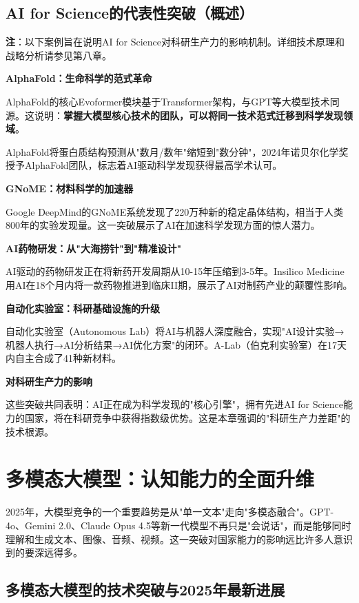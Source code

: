 \subsection{AI for Science的代表性突破（概述）}

\textbf{注}：以下案例旨在说明AI for Science对科研生产力的影响机制。详细技术原理和战略分析请参见第八章。

\textbf{AlphaFold：生命科学的范式革命}

AlphaFold的核心Evoformer模块基于Transformer架构，与GPT等大模型技术同源。这说明：\textbf{掌握大模型核心技术的团队，可以将同一技术范式迁移到科学发现领域}。

AlphaFold将蛋白质结构预测从"数月/数年"缩短到"数分钟"，2024年诺贝尔化学奖授予AlphaFold团队，标志着AI驱动科学发现获得最高学术认可。

\textbf{GNoME：材料科学的加速器}

Google DeepMind的GNoME系统发现了220万种新的稳定晶体结构，相当于人类800年的实验发现量。这一突破展示了AI在加速科学发现方面的惊人潜力。

\textbf{AI药物研发：从"大海捞针"到"精准设计"}

AI驱动的药物研发正在将新药开发周期从10-15年压缩到3-5年。Insilico Medicine用AI在18个月内将一款药物推进到临床II期，展示了AI对制药产业的颠覆性影响。

\textbf{自动化实验室：科研基础设施的升级}

自动化实验室（Autonomous Lab）将AI与机器人深度融合，实现"AI设计实验→机器人执行→AI分析结果→AI优化方案"的闭环。A-Lab（伯克利实验室）在17天内自主合成了41种新材料。

\textbf{对科研生产力的影响}

这些突破共同表明：AI正在成为科学发现的"核心引擎"，拥有先进AI for Science能力的国家，将在科研竞争中获得指数级优势。这是本章强调的"科研生产力差距"的技术根源。


\section{多模态大模型：认知能力的全面升维}

2025年，大模型竞争的一个重要趋势是从"单一文本"走向"多模态融合"。GPT-4o、Gemini 2.0、Claude Opus 4.5等新一代模型不再只是"会说话"，而是能够同时理解和生成文本、图像、音频、视频。这一突破对国家能力的影响远比许多人意识到的要深远得多。

\subsection{多模态大模型的技术突破与2025年最新进展}

